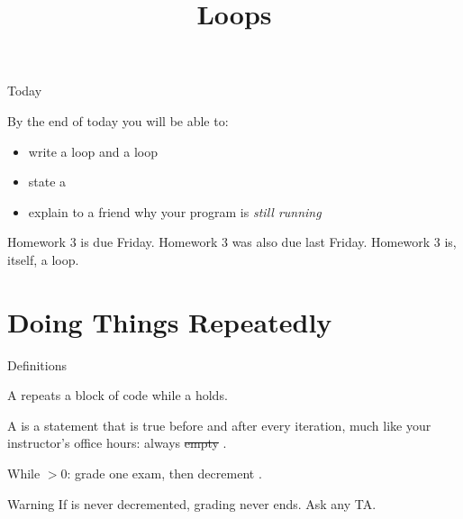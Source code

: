 \documentclass[10pt,aspectratio=169,xcolor=table]{beamer}
\title{Loops}
\begin{document}
\maketitle

\begin{frame}{Today}
  \begin{objectives}
    By the end of today you will be able to:
    \begin{itemize}
      \item write a  loop and a  loop
      \item state a 
      \item explain to a friend why your program is \emph{still running}
    \end{itemize}
  \end{objectives}
  \begin{aside}[Logistics]
    Homework 3 is due Friday. Homework 3 was also due last Friday.
    Homework 3 is, itself, a loop.
  \end{aside}
\end{frame}

\section{Doing Things Repeatedly}

\begin{frame}{Definitions}
  \begin{definition}[Loop]
    A  repeats a block of code while a  holds.
  \end{definition}
  \begin{definition}
    A  is a statement that is true before and after
    every iteration, much like your instructor's office hours: always
    \sout<2->{empty} .
  \end{definition}
  \begin{example}
    While  $> 0$: grade one exam, then decrement .
  \end{example}
  \begin{alertblock}{Warning}
    If  is never decremented, grading never ends.
    Ask any TA.
  \end{alertblock}
\end{frame}
\end{document}
